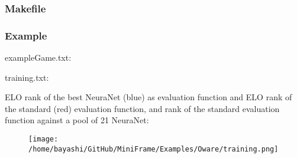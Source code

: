 \begin{scriptsize}
\begin{ttfamily}

\end{ttfamily}
\end{scriptsize}

\subsubsection{Makefile}

\begin{scriptsize}
\begin{ttfamily}

\end{ttfamily}
\end{scriptsize}

\subsubsection{Example}

exampleGame.txt:\\
\begin{scriptsize}
\begin{ttfamily}

\end{ttfamily}
\end{scriptsize}

training.txt:\\
\begin{scriptsize}
\begin{ttfamily}

\end{ttfamily}
\end{scriptsize}

ELO rank of the best NeuraNet (blue) as evaluation function and ELO rank of the standard (red) evaluation function, and rank of the standard evaluation function against a pool of 21 NeuraNet:\\

\begin{center}
\begin{figure}[H]
\centering\texttt{[image: /home/bayashi/GitHub/MiniFrame/Examples/Oware/training.png]}\\
\end{figure}
\end{center}
